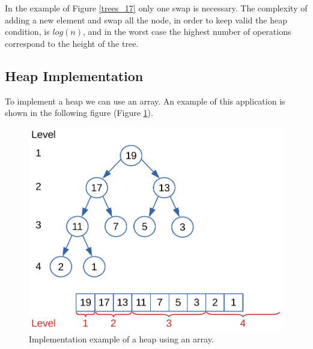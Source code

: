 In the example of Figure \ref{trees_17} only one swap is necessary. The complexity of adding a new element and swap all the node, in order to keep valid the heap condition, is \(log(n)\), and in the worst case the highest number of operations correspond to the height of the tree.

\subsection{Heap Implementation}
To implement a heap we can use an array. An example of this application is shown in the following figure (Figure \ref{trees_18}).

\begin{figure}[H]
	\begin{center}
		\includegraphics[scale=.6]{chapters/trees/images/trees_18.pdf}
		\caption[Implementation example of a heap using an array.]{Implementation example of a heap using an array.}
		\label{trees_18}
	\end{center}
\end{figure}


